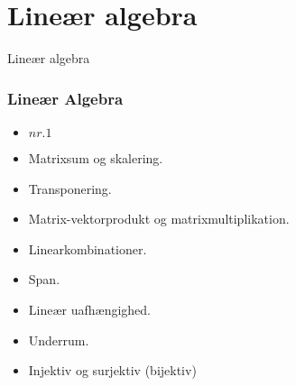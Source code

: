 \section{Lineær algebra}
\begin{frame}
\centering
\Huge
Lineær algebra
\end{frame}
%
\begin{frame}
\frametitle{Lineær Algebra}
\begin{itemize}
\item \textbf{$nr. 1$}
\item Matrixsum og skalering.
\item Transponering.
\item Matrix-vektorprodukt og matrixmultiplikation.
\item Linearkombinationer.
\item Span.
\item Lineær uafhængighed.
\item Underrum.
\item Injektiv og surjektiv (bijektiv)
\end{itemize}
\end{frame}
